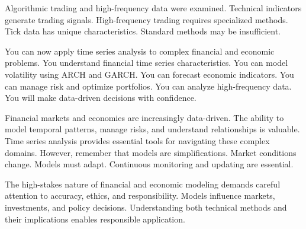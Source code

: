 Algorithmic trading and high-frequency data were examined. Technical indicators generate trading signals. High-frequency trading requires specialized methods. Tick data has unique characteristics. Standard methods may be insufficient.

You can now apply time series analysis to complex financial and economic problems. You understand financial time series characteristics. You can model volatility using ARCH and GARCH. You can forecast economic indicators. You can manage risk and optimize portfolios. You can analyze high-frequency data. You will make data-driven decisions with confidence.

Financial markets and economies are increasingly data-driven. The ability to model temporal patterns, manage risks, and understand relationships is valuable. Time series analysis provides essential tools for navigating these complex domains. However, remember that models are simplifications. Market conditions change. Models must adapt. Continuous monitoring and updating are essential.

The high-stakes nature of financial and economic modeling demands careful attention to accuracy, ethics, and responsibility. Models influence markets, investments, and policy decisions. Understanding both technical methods and their implications enables responsible application.


